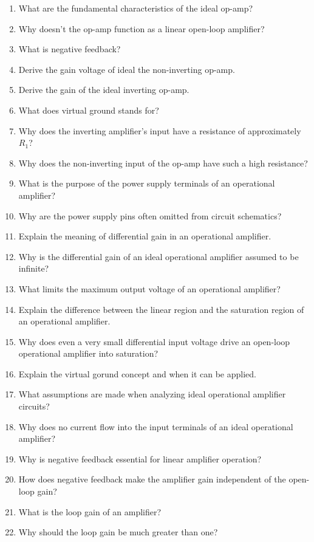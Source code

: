 \documentclass[../main.tex]{subfiles}
\begin{document}
\begin{enumerate}[label=\textbf{\arabic*.}]
	\item What are the fundamental characteristics of the ideal op-amp?
	\item Why doesn't the op-amp function as a linear open-loop amplifier?
	\item What is negative feedback?
	\item Derive the gain voltage of ideal the non-inverting op-amp.
	\item Derive the gain of the ideal inverting op-amp.
	\item What does virtual ground stands for?
	\item Why does the inverting amplifier's input have a resistance of approximately $R_1$?
	\item Why does the non-inverting input of the op-amp have such a high resistance?
	\item What is the purpose of the power supply terminals of an operational amplifier?
	\item Why are the power supply pins often omitted from circuit schematics?
	\item Explain the meaning of differential gain in an operational amplifier.
	\item Why is the differential gain of an ideal operational amplifier assumed to be infinite?
	\item What limits the maximum output voltage of an operational amplifier?
	\item Explain the difference between the linear region and the saturation region of an operational amplifier.
	\item Why does even a very small differential input voltage drive an open-loop operational amplifier into saturation?
	\item Explain the virtual gorund concept and when it can be applied.
	\item What assumptions are made when analyzing ideal operational amplifier circuits?
	\item Why does no current flow into the input terminals of an ideal operational amplifier?
	\item Why is negative feedback essential for linear amplifier operation?
	\item How does negative feedback make the amplifier gain independent of the open-loop gain?
	\item What is the loop gain of an amplifier?
	\item Why should the loop gain be much greater than one?

\end{enumerate}
\end{document}
